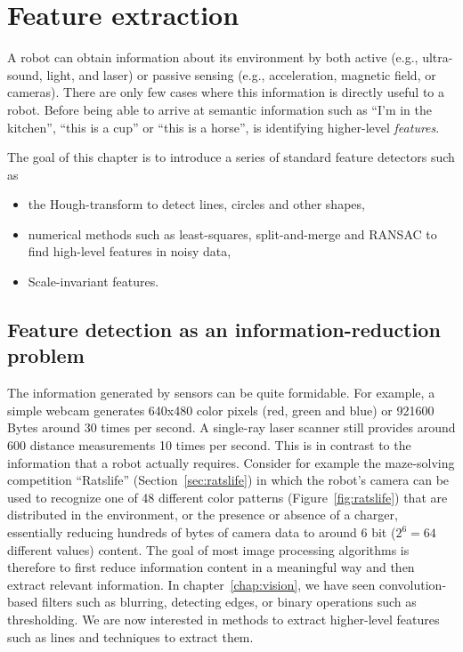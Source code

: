 \chapter{Feature extraction}\label{chap:feature_extraction}
A robot can obtain information about its environment by both active (e.g., ultra-sound, light, and laser) or passive sensing (e.g., acceleration, magnetic field, or cameras). There are only few cases where this information is directly useful to a robot. Before being able to arrive at semantic information such as ``I'm in the kitchen'', ``this is a cup'' or ``this is a horse'', is identifying higher-level \emph{features}.

The goal of this chapter is to introduce a series of standard feature detectors such as
\begin{itemize}
\item the Hough-transform to detect lines, circles and other shapes,
\item numerical methods such as least-squares, split-and-merge and RANSAC to find high-level features in noisy data,
\item Scale-invariant features.
\end{itemize}

\section{Feature detection as an information-reduction problem}
The information generated by sensors can be quite formidable. For example, a simple webcam generates 640x480 color pixels (red, green and blue) or 921600 Bytes around 30 times per second. A single-ray laser scanner still provides around 600 distance measurements 10 times per second. This is in contrast to the information that a robot actually requires. Consider for example the maze-solving competition ``Ratslife'' (Section~\ref{sec:ratslife}) in which the robot's camera can be used to recognize one of 48 different color patterns (Figure~\ref{fig:ratslife}) that are distributed in the environment, or the presence or absence of a charger, essentially reducing hundreds of bytes of camera data to around 6 bit ($2^6=64$ different values) content. The goal of most image processing algorithms is therefore to first reduce information content in a meaningful way and then extract relevant information. In chapter~\ref{chap:vision}, we have seen convolution-based filters such as blurring, detecting edges, or binary operations such as thresholding. We are now interested in methods to extract higher-level features such as lines and techniques to extract them.

